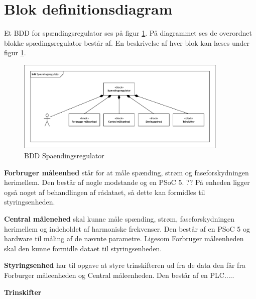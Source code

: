 
\section{Blok definitionsdiagram}
Et BDD for spændingsregulator ses på figur \ref{fig:BDDSpaendingsregulator}. På diagrammet ses de overordnet blokke spædingsregulator består af. En beskrivelse af hver blok kan læses under figur \ref{fig:BDDSpaendingsregulator}.

\begin{figure}[htbp] %
	\centering
	\includegraphics[width=0.9\textwidth]{Figure/BDDSpaendingsregulator}
	\caption{BDD Spaendingsregulator}
	\label{fig:BDDSpaendingsregulator}
\end{figure}

\textbf{Forbruger måleenhed} står for at måle spænding, strøm og faseforskydningen herimellem. Den består af nogle modstande og en PSoC 5. ?? På enheden ligger også noget af behandlingen af rådataet, så dette kan formidles til styringsenheden.

\textbf{Central målenehed} skal kunne måle spænding, strøm, faseforskydningen herimellem og indeholdet af harmoniske frekvenser. Den består af en PSoC 5 og hardware til måling af de nævnte parametre. Ligesom Forbruger måleenheden skal den kunne formidle dataet til styringsenheden.

\textbf{Styringsenhed} har til opgave at styre trinskifteren ud fra de data den får fra Forburger måleenheden og Central måleenheden. Den består af en PLC.....

\textbf{Trinskifter}